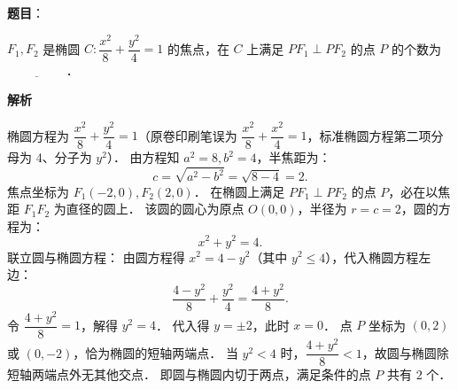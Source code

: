 \begin{answer}

\textbf{题目}：

$F_1, F_2$ 是椭圆 $C: \dfrac{x^2}{8} + \dfrac{y^2}{4} = 1$ 的焦点，在 $C$ 上满足 $PF_1 \perp PF_2$ 的点 $P$ 的个数为 $\underline{\hspace{2cm}}$．

\textbf{解析}

椭圆方程为 $\dfrac{x^2}{8} + \dfrac{y^2}{4} = 1$（原卷印刷笔误为 $\dfrac{x^2}{8} + \dfrac{x^2}{4} = 1$，标准椭圆方程第二项分母为 4、分子为 $y^2$）．
由方程知 $a^2 = 8, b^2 = 4$，半焦距为：
\nopagebreak[4]
\[
c = \sqrt{a^2 - b^2} = \sqrt{8 - 4} = 2.
\]
焦点坐标为 $F_1(-2, 0), F_2(2, 0)$．
在椭圆上满足 $PF_1 \perp PF_2$ 的点 $P$，必在以焦距 $F_1F_2$ 为直径的圆上．
该圆的圆心为原点 $O(0, 0)$，半径为 $r = c = 2$，圆的方程为：
\nopagebreak[4]
\[
x^2 + y^2 = 4.
\]
联立圆与椭圆方程：
由圆方程得 $x^2 = 4 - y^2$（其中 $y^2 \leqslant 4$），代入椭圆方程左边：
\nopagebreak[4]
\[
\frac{4 - y^2}{8} + \frac{y^2}{4} = \frac{4 + y^2}{8}.
\]
令 $\dfrac{4 + y^2}{8} = 1$，解得 $y^2 = 4$．
代入得 $y = \pm 2$，此时 $x = 0$．
点 $P$ 坐标为 $(0, 2)$ 或 $(0, -2)$，恰为椭圆的短轴两端点．
当 $y^2 < 4$ 时，$\dfrac{4 + y^2}{8} < 1$，故圆与椭圆除短轴两端点外无其他交点．
即圆与椭圆内切于两点，满足条件的点 $P$ 共有 $2$ 个．


\end{answer}
